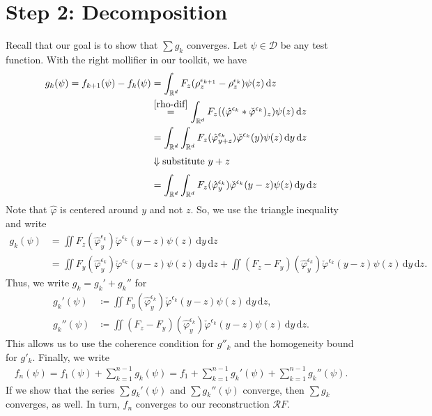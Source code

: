 \section{Step 2: Decomposition}\label{step2:decomposition}

Recall that our goal is to show that \( \sum g_k \) converges.
Let \(\psi \in \mathcal{D}\) be any test function. With the right mollifier in our toolkit, we have
\begin{align*}
    g_k(\psi) = f_{k+1}(\psi) - f_k(\psi) 
    &= \int_{\mathbb{R}^d} F_z(\rho_z^{\epsilon_{k+1}} - \rho_z^{\epsilon_k}) \psi(z)\, \mathrm{d}z \\
    &\overset{\eqref{rho-dif}}{=} \int_{\mathbb{R}^d} F_z((\hat \varphi^{\epsilon_k} * \check \varphi^{\epsilon_k} )_z) \psi(z)\, \mathrm{d}z \\
    &= \int_{\mathbb{R}^d} \int_{\mathbb{R}^{d}} F_z(\hat{\varphi}^{\epsilon_k}_{y+z}) \check \varphi^
    {\epsilon_k}(y) \psi(z) \, \mathrm{d}y \, \mathrm{d}z \\
    \\[-1.2em]
    &\Downarrow \text{substitute \(y+z\)} \\
    \\[-1.2em]
    &= \int_{\mathbb{R}^d} \int_{\mathbb{R}^{d}} F_z(\hat{\varphi}^{\epsilon_k}_{y}) \check \varphi^{\epsilon_k}(y-z) \psi(z) \, \mathrm{d}y \, \mathrm{d}z
\end{align*}
Note that \( \hat \varphi \) is centered around \( y \) and not \( z \). So, we use the triangle inequality and write 
\begin{align*}
    g_k(\psi) &= \iint F_z(\hat{\varphi}^{\epsilon_k}_{y}) \check \varphi^{\epsilon_k}(y-z) \psi(z) \, \mathrm{d}y \, \mathrm{d}z \\
    &=  \iint F_y(\hat{\varphi}^{\epsilon_k}_{y}) \check \varphi^{\epsilon_k}(y-z) \psi(z) \, \mathrm{d}y \, \mathrm{d}z +  \iint (F_z - F_y)(\hat{\varphi}^{\epsilon_k}_{y}) \check \varphi^{\epsilon_k}(y-z) \psi(z) \, \mathrm{d}y \, \mathrm{d}z.
\end{align*}
Thus, we write \(g_k = g_k' + g_k''\) for 
\begin{align*}
    g_k'(\psi) &\coloneqq \iint F_y(\hat{\varphi}^{\epsilon_k}_{y}) \check \varphi^{\epsilon_k}(y-z) \psi(z) \, \mathrm{d}y \, \mathrm{d}z, \\
    g_k''(\psi) & \coloneqq \iint (F_z - F_y)(\hat{\varphi}^{\epsilon_k}_{y}) \check \varphi^{\epsilon_k}(y-z) \psi(z) \, \mathrm{d}y \, \mathrm{d}z.
\end{align*}
This allows us to use the coherence condition for \( g''_k \) and the homogeneity bound for \( g'_k \). Finally, we write
\begin{align}\label{approximating-distributions-alternative}
    f_n(\psi)= f_1(\psi) + \sum^{n-1}_{k=1} g_k(\psi) = f_1 + \sum^{n-1}_{k=1} g_k'(\psi) + \sum^{n-1}_{k=1} g_k''(\psi).
\end{align}
If we show that the series \( \sum g_k'(\psi)\) and \( \sum g_k''(\psi)\) converge, then \( \sum g_k \) converges, as well. In turn, \( f_n \) converges to our reconstruction \( \mathcal{R}F \).

